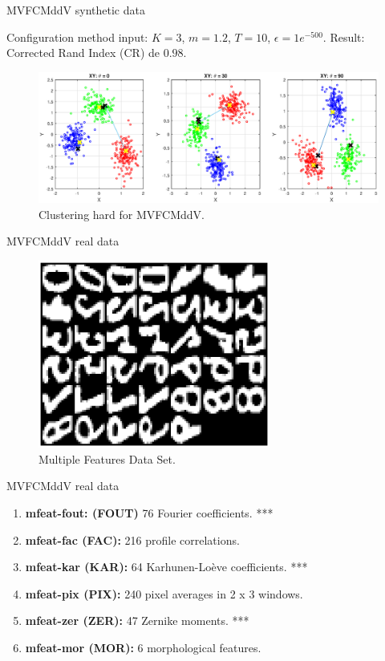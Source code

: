 \documentclass{beamer}
\begin{document}
\begin{frame}{MVFCMddV synthetic data}

Configuration method input: $K = 3$, $m = 1.2$, $T = 10$, $\epsilon = 1e^{-500}$.
Result: Corrected Rand Index (CR) de $0.98$.
\begin{figure}[h]
\centering
\includegraphics[width=4.5in]{../out/clusters-gauss-3.eps}
\caption{Clustering hard for MVFCMddV.}
\label{fig:cluster_datos_sinteticos}
\end{figure}  

\end{frame}


\begin{frame}{MVFCMddV real data}
\begin{figure}[h]
\centering
\includegraphics[width=3.0in]{../out/data-base.eps}
\caption{Multiple Features Data Set.}
\label{fig:data_base}
\end{figure}  
\end{frame}

\begin{frame}{MVFCMddV real data}
\begin{enumerate}
\item \textbf{mfeat-fout: (FOUT)} 76 Fourier coefficients. ***
\item \textbf{mfeat-fac (FAC):} 216 profile correlations.
\item \textbf{mfeat-kar (KAR):} 64 Karhunen-Loève coefficients. ***
\item \textbf{mfeat-pix (PIX):} 240 pixel averages in 2 x 3 windows.
\item \textbf{mfeat-zer (ZER):} 47 Zernike moments. ***
\item \textbf{mfeat-mor (MOR):} 6 morphological features.
\end{enumerate}
\end{frame}
\end{document}
